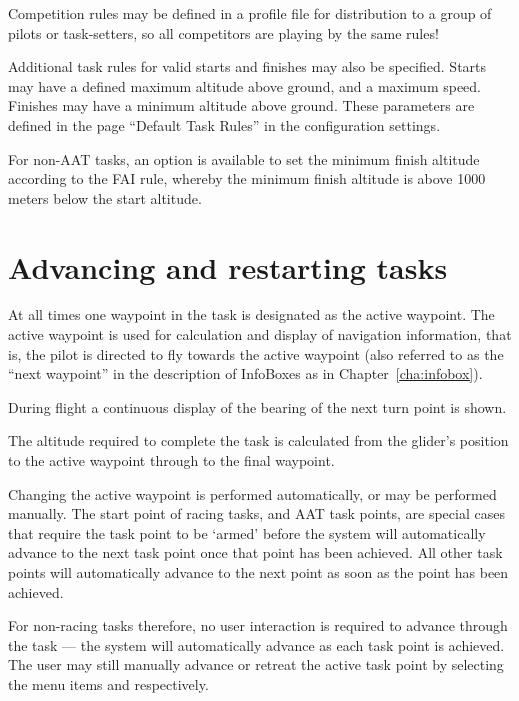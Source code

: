 \tip Competition rules may be defined in a profile file for
distribution to a group of pilots or task-setters, so all competitors
are playing by the same rules!

Additional task rules for valid starts and finishes may also be
specified.  Starts may have a defined maximum altitude above ground,
and a maximum speed.  Finishes may have a minimum altitude above
ground.  These parameters are defined in the page ``Default Task Rules'' in
the configuration  settings.

For non-AAT tasks, an option is available to set the minimum finish
altitude according to the FAI rule, whereby the minimum finish
altitude is above 1000 meters below the start altitude.




\section{Advancing and restarting tasks}\label{sec:advanc-rest-tasks}
At all times one waypoint in the task is designated as the active
waypoint.  The active waypoint is used for calculation and display of
navigation information, that is, the pilot is directed to fly towards
the active waypoint (also referred to as the ``next waypoint'' in the
description of InfoBoxes as in Chapter~\ref{cha:infobox}).

During flight a continuous display of the bearing of the next turn
point is shown.

The altitude required to complete the task is calculated from the
glider's position to the active waypoint through to the final
waypoint.

Changing the active waypoint is performed automatically, or may be performed manually.
The start point of racing tasks, and AAT task points, are special cases that require
the task point to be `armed' before the system will automatically advance to the next
task point once that point has been achieved.  All other task points will automatically
advance to the next point as soon as the point has been achieved.

For non-racing tasks therefore, no user interaction is required to
advance through the task --- the system will automatically advance as
each task point is achieved.  The user may still manually advance or retreat the active
task point by selecting the menu items \blink{} and
\blink{} respectively.


